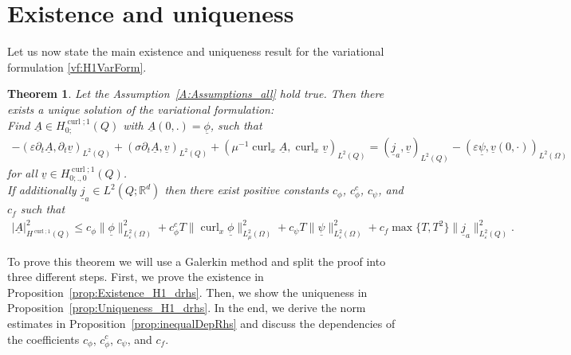 \documentclass[a4paper,11pt]{article}
\newtheorem{thm}{Theorem}[section]
\newcommand{\R}{\mathbb R}
\newcommand{\cu}{\operatorname{curl}}
\renewcommand{\vec}[1]{\underline{#1}}
\begin{document}
\section{Existence and uniqueness}
Let us now state the main existence and uniqueness result for the variational formulation \eqref{vf:H1VarForm}.
\begin{thm}\label{thm:ExistenceAndUniqueness}
	Let the Assumption~\ref{A:Assumptions_all} hold true. Then there exists a unique solution of the variational formulation:\\
	Find $ \vec A\in H^{\cu;1}_{0;}(Q) $ with $\vec A(0,.)=\vec \phi$, such that
	\begin{align*}
		-\left(\varepsilon\partial_t  \vec A,\partial_t \vec v\right)_{L^2(Q)} + \left( \sigma\partial_t \vec A , \vec v\right)_{L^2(Q)}+\left(\mu^{-1}	\cu_x \vec A, \cu_x  \vec v\right)_{L^2(Q)}
		= \left( \vec j_a, \vec v\right)_{L^2(Q)} -\left(\varepsilon\vec \psi, \vec v(0,\cdot)\right)_{L^2(\Omega)} 
	\end{align*}
	for all $\vec v\in H^{\cu;1}_{0;.,0}(Q) $. \\
	If additionally $\vec j_a\in L^2(Q;\R^d)$ then there exist positive constants  $c_\phi$, $c_\phi^c$, $c_\psi$,  and $c_f$  such that
	\begin{align*}
		|\vec A|^2_{H^{\cu;1}(Q)} \leq c_\phi\|\vec \phi\|^2_{L^2_{\varepsilon}({\Omega})} +c_\phi^cT \|\cu_x\vec \phi\|^2_{L^2_\mu(\Omega)} + c_\psi T\| \vec \psi\|^2_{L^2_{\varepsilon}({\Omega})}  + c_f \max\{T,T^2\} \|\vec j_a\|^2_{L^2_{\varepsilon}({Q})}.
	\end{align*}
\end{thm} 
To prove this theorem we will use a Galerkin method and split the proof into three different steps. First, we prove the existence in Proposition~\ref{prop:Existence_H1_drhs}. Then, we show the uniqueness in Proposition~\ref{prop:Uniqueness_H1_drhs}. In the end, we derive the norm estimates in Proposition~\ref{prop:inequalDepRhs} and discuss the dependencies of the coefficients $c_\phi$, $c_\phi^c$, $c_\psi$,  and $c_f$.
\end{document}
